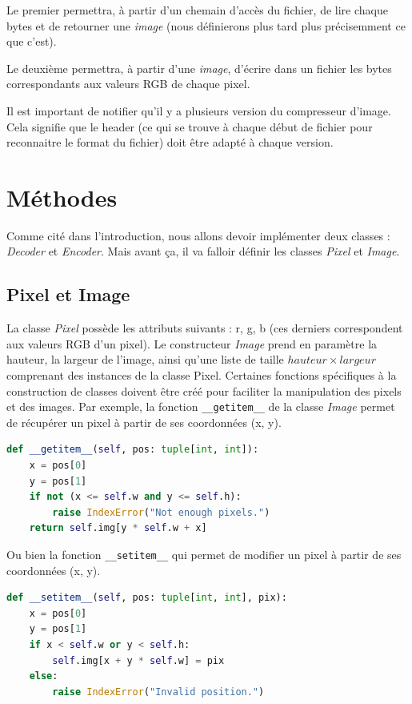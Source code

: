 \documentclass[utf8]{article}
\begin{document}
Le premier permettra, à partir d'un chemain d'accès du fichier, de lire chaque bytes et de retourner une \textit{image} (nous définierons plus tard plus précisemment ce que c'est).  

Le deuxième permettra, à partir d'une \textit{image}, d'écrire dans un fichier les bytes correspondants aux valeurs RGB de chaque pixel.

Il est important de notifier qu'il y a plusieurs version du compresseur d'image. Cela signifie que le header (ce qui se trouve à chaque début de fichier pour reconnaitre le format du fichier) doit être adapté à chaque version.


\section{Méthodes}
Comme cité dans l'introduction, nous allons devoir implémenter deux classes : \textit{Decoder} et \textit{Encoder}. Mais avant ça, il va falloir définir les classes \textit{Pixel} et \textit{Image}. 
\subsection{Pixel et Image}
La classe \textit{Pixel} possède les attributs suivants : r, g, b (ces derniers correspondent aux valeurs RGB d'un pixel). 
Le constructeur \textit{Image} prend en paramètre la hauteur, la largeur de l'image, ainsi qu'une liste de taille $hauteur \times largeur$ comprenant des instances de la classe Pixel.
Certaines fonctions spécifiques à la construction de classes doivent être créé pour faciliter la manipulation des pixels et des images. Par exemple, la fonction \texttt{__getitem__} de la classe \textit{Image} permet de récupérer un pixel à partir de ses coordonnées (x, y).

\begin{lstlisting}[language=Python]
def __getitem__(self, pos: tuple[int, int]):
    x = pos[0]
    y = pos[1]
    if not (x <= self.w and y <= self.h):
        raise IndexError("Not enough pixels.")
    return self.img[y * self.w + x]

\end{lstlisting}

Ou bien la fonction \texttt{__setitem__} qui permet de modifier un pixel à partir de ses coordonnées (x, y).
\begin{lstlisting}[language=Python]
 def __setitem__(self, pos: tuple[int, int], pix):
    x = pos[0]
    y = pos[1]
    if x < self.w or y < self.h:
        self.img[x + y * self.w] = pix
    else:
        raise IndexError("Invalid position.")

\end{lstlisting}
\end{document}

